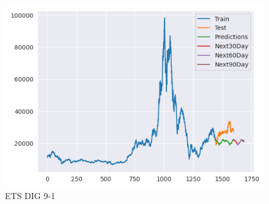 \documentclass[conference]{IEEEtran}
\begin{document}
\begin{enumerate}
\begin{figure}[htbp]
\begin{minipage}{0.23\textwidth}
    \includegraphics[width=1\textwidth]{experiment/ets/TEAM4_ETS_DIG_9_1.png}
    \caption{ETS DIG 9-1}
    \label{fig:nvl_histogram}
    \end{minipage}

    \vspace{0.5cm} %


\end{figure}
\end{enumerate}
\end{document}

